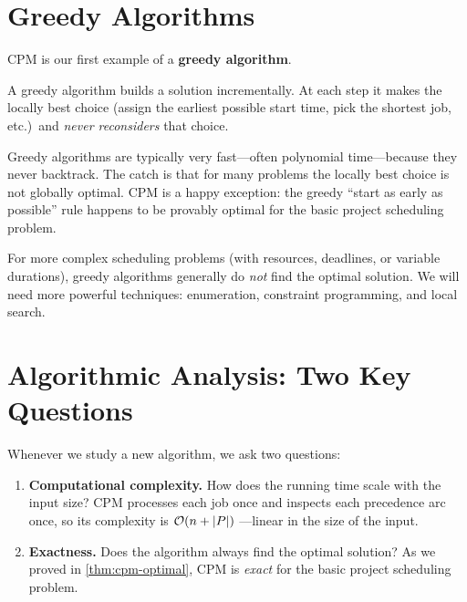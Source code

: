 \section{Greedy Algorithms}
\label{sec:greedy-intro}

CPM is our first example of a \textbf{greedy algorithm}.%

\begin{definition}
\label{def:greedy}
A greedy algorithm builds a solution incrementally.  At each step
it makes the locally best choice (assign the earliest possible
start time, pick the shortest job, etc.)\ and \emph{never
reconsiders} that choice.
\end{definition}

Greedy algorithms are typically very fast---often polynomial
time---because they never backtrack.  The catch is that for many
problems the locally best choice is not globally optimal.
CPM is a happy exception: the greedy ``start as early as possible''
rule happens to be provably optimal for the basic project
scheduling problem.

\begin{observation}
For more complex scheduling problems (with resources, deadlines,
or variable durations), greedy algorithms generally do \emph{not}
find the optimal solution.  We will need more powerful techniques:
enumeration, constraint programming, and local search.
\end{observation}


\section{Algorithmic Analysis: Two Key Questions}
\label{sec:algo-analysis}

Whenever we study a new algorithm, we ask two questions:

\begin{enumerate}
  \item \textbf{Computational complexity.}
    How does the running time scale with the input size?
    CPM processes each job once and inspects each precedence arc
    once, so its complexity is
    $\mathcal{O}\!\left(n + |P|\right)$%
    ---linear in the size of the input.

  \item \textbf{Exactness.}
    Does the algorithm always find the optimal solution?
    As we proved in \cref{thm:cpm-optimal}, CPM is \emph{exact}
    for the basic project scheduling problem.
\end{enumerate}

